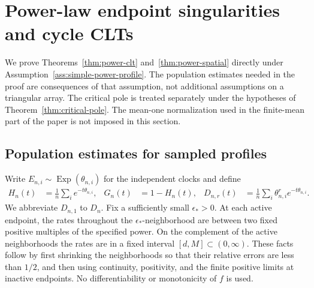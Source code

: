 \documentclass[11pt]{article}
\theoremstyle{remark}
\theoremstyle{plain}
\begin{document}
\section{Power-law endpoint singularities and cycle CLTs}
\label{sec:power-law}

We prove Theorems~\ref{thm:power-clt} and~\ref{thm:power-spatial}
directly under Assumption~\ref{ass:simple-power-profile}.  The population
estimates needed in the proof are consequences of that assumption, not
additional assumptions on a triangular array.  The critical pole is treated
separately under the hypotheses of Theorem~\ref{thm:critical-pole}.
The mean-one normalization used in the finite-mean part of the paper is not
imposed in this section.

\subsection{Population estimates for sampled profiles}

Write $E_{n,i}\sim\operatorname{Exp}(\theta_{n,i})$ for the independent
clocks and define
\begin{align}
 H_n(t)&=\frac1n\sum_i e^{-t\theta_{n,i}},&
 G_n(t)&=1-H_n(t),&
 D_{n,r}(t)&=\frac1n\sum_i\theta_{n,i}^r e^{-t\theta_{n,i}}.
 \label{eq:sp-transforms}
\end{align}
We abbreviate $D_{n,1}$ to $D_n$.  Fix a sufficiently small
$\epsilon_*>0$.  At each active endpoint, the rates throughout the
$\epsilon_*$-neighborhood are between two fixed positive multiples of the
specified power.  On the complement of the active neighborhoods the rates
are in a fixed interval $[d,M]\subset(0,\infty)$.  These facts follow by
first shrinking the neighborhoods so that their relative errors are less
than $1/2$, and then using continuity, positivity, and the finite positive
limits at inactive endpoints.  No differentiability or monotonicity of $f$
is used.
\end{document}
